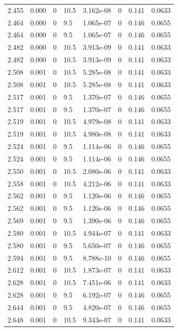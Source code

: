 \documentclass[preview]{standalone}
\begin{document}
{{{{{{{{\begin{tabular}{L{1.2cm}C{1.2cm} C{0.3cm}C{0.5cm} C{1.4cm}C{1.4cm} C{1.4cm}C{1.4cm}}
  2.455  &  0.000  & 0     & 10.5 &  3.162e-08  & 0  & 0.141 &  0.0633   \\ 
  2.464  &  0.000  & 0     & 9.5 &  1.065e-07  & 0  & 0.146 &  0.0655   \\ 
  2.464  &  0.000  & 0     & 9.5 &  1.065e-07  & 0  & 0.146 &  0.0655   \\ 
  2.482  &  0.000  & 0     & 10.5 &  3.913e-09  & 0  & 0.141 &  0.0633   \\ 
  2.482  &  0.000  & 0     & 10.5 &  3.913e-09  & 0  & 0.141 &  0.0633   \\ 
  2.508  &  0.001  & 0     & 10.5 &  5.285e-08  & 0  & 0.141 &  0.0633   \\ 
  2.508  &  0.001  & 0     & 10.5 &  5.285e-08  & 0  & 0.141 &  0.0633   \\ 
  2.517  &  0.001  & 0     & 9.5 &  1.370e-07  & 0  & 0.146 &  0.0655   \\ 
  2.517  &  0.001  & 0     & 9.5 &  1.370e-07  & 0  & 0.146 &  0.0655   \\ 
  2.519  &  0.001  & 0     & 10.5 &  4.979e-08  & 0  & 0.141 &  0.0633   \\ 
  2.519  &  0.001  & 0     & 10.5 &  4.980e-08  & 0  & 0.141 &  0.0633   \\ 
  2.524  &  0.001  & 0     & 9.5 &  1.114e-06  & 0  & 0.146 &  0.0655   \\ 
  2.524  &  0.001  & 0     & 9.5 &  1.114e-06  & 0  & 0.146 &  0.0655   \\ 
  2.550  &  0.001  & 0     & 10.5 &  2.080e-06  & 0  & 0.141 &  0.0633   \\ 
  2.558  &  0.001  & 0     & 10.5 &  4.212e-06  & 0  & 0.141 &  0.0633   \\ 
  2.562  &  0.001  & 0     & 9.5 &  1.120e-06  & 0  & 0.146 &  0.0655   \\ 
  2.562  &  0.001  & 0     & 9.5 &  1.120e-06  & 0  & 0.146 &  0.0655   \\ 
  2.569  &  0.001  & 0     & 9.5 &  1.390e-06  & 0  & 0.146 &  0.0655   \\ 
  2.580  &  0.001  & 0     & 10.5 &  4.944e-07  & 0  & 0.141 &  0.0633   \\ 
  2.580  &  0.001  & 0     & 9.5 &  5.650e-07  & 0  & 0.146 &  0.0655   \\ 
  2.594  &  0.001  & 0     & 9.5 &  8.788e-10  & 0  & 0.146 &  0.0655   \\ 
  2.612  &  0.001  & 0     & 10.5 &  1.873e-07  & 0  & 0.141 &  0.0633   \\ 
  2.628  &  0.001  & 0     & 10.5 &  7.451e-06  & 0  & 0.141 &  0.0633   \\ 
  2.628  &  0.001  & 0     & 9.5 &  6.192e-07  & 0  & 0.146 &  0.0655   \\ 
  2.644  &  0.001  & 0     & 9.5 &  4.820e-07  & 0  & 0.146 &  0.0655   \\ 
  2.648  &  0.001  & 0     & 10.5 &  9.343e-07  & 0  & 0.141 &  0.0633   \\ 
\hline 
\end{tabular} 

}}}}}}}}
\end{document}
